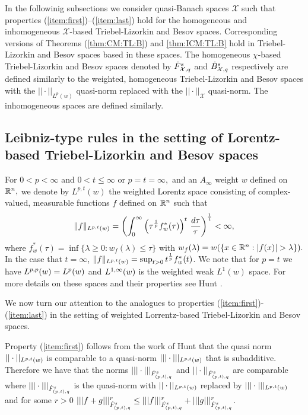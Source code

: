In the followinig subsections we consider quasi-Banach spaces $\mathcal{X}$ such that properties (\ref{item:first})--(\ref{item:last}) hold for the homogeneous and inhomogeneous $\mathcal{X}$-based Triebel-Lizorkin and Besov spaces. Corresponding versions of Theorems (\ref{thm:CM:TL:B}) and \ref{thm:ICM:TL:B} hold in Triebel-Lizorkin and Besov spaces based in these spaces. The homogeneous $\chi$-based Triebel-Lizorkin and Besov spaces denoted by $\tl{\mathcal{X}}{s}{q}$ and $\bes{\mathcal{X}}{s}{q}$ respectively are defined similarly to the weighted, homogeneous Triebel-Lizorkin and Besov spaces with the $||\cdot||_{L^p(w)}$ quasi-norm replaced with the $||\cdot||_\mathcal{X}$ quasi-norm. The inhomogeneous spaces are defined similarly. 

 \subsection{Leibniz-type rules in the setting of Lorentz-based Triebel-Lizorkin and Besov spaces}
 For $0<p<\infty$ and $0<t\le \infty$ or $p=t=\infty,$ and an $A_\infty$ weight $w$ defined on $\rn,$  we denote by $L^{p,t}(w)$ the weighted Lorentz space consisting of complex-valued, measurable functions $f$ defined on $\rn$ such that
\[
\|f\|_{\lebw{p,t}{w}}=\left(\int_0^\infty \left(\tau^{\frac{1}{p}} f_w^*(\tau)\right)^t\,\frac{d\tau}{\tau}\right)^{\frac{1}{t}}<\infty,
\]
where $f^*_w(\tau)=\inf\{\lambda\ge 0:w_f(\lambda)\le \tau\}$ with
$w_f(\lambda)=w(\{x\in\rn : \abs{f(x)}>\lambda\}).$ 
In the case that $t=\infty$, $\|f\|_{\lebw{p,t}{w}}= \sup_{t>0}t^{\frac{1}{p}}f_w^*(t)$. We note that for $p=t$ we have $\lebw{p,p}{w} = \lebw{p}{w}$ and $\lebw{1,\infty}{w}$ is the weighted weak $L^1(w)$ space. For more details on these spaces and their properties see Hunt \cite{MR0223874}. 

We now turn our attention to the analogues to properties (\ref{item:first})-(\ref{item:last}) in the setting of weighted Lorrentz-based Triebel-Lizorkin and Besov spaces. 

Property (\ref{item:first}) follows from the work of Hunt \cite{MR0223874} that the quasi norm $||\cdot||_{\lebw{p,t}{w}}$ is comparable to a quasi-norm $|||\cdot|||_{\lebw{p,t}{w}}$ that is subadditive. Therefore we have that the norms $|||\cdot|||_{\tl{(p,t)}{s}{q}}$ and $||\cdot||_{\tl{(p,t)}{s}{q}}$ are comparable where $|||\cdot|||_{\tl{(p,t)}{s}{q}}$ is the quasi-norm with $||\cdot||_{\lebw{p,t}{w}}$ replaced by $|||\cdot|||_{\lebw{p,t}{w}}$ and for some $r>0$ $|||f+g|||^r_{\tl{(p,t)}{s}{q}} \leq |||f|||^r_{\tl{(p,t)}{s}{q}} + |||g|||^r_{\tl{(p,t)}{s}{q}}$. 


